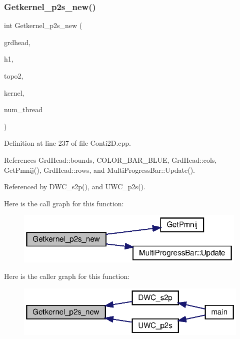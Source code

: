 \subsubsection{Getkernel\+\_\+p2s\+\_\+new()}
{\footnotesize\ttfamily int Getkernel\+\_\+p2s\+\_\+new (\begin{DoxyParamCaption}\item[{\textbf{ Grd\+Head}}]{grdhead,  }\item[{double}]{h1,  }\item[{double $\ast$}]{topo2,  }\item[{double $\ast$$\ast$}]{kernel,  }\item[{int}]{num\+\_\+thread }\end{DoxyParamCaption})}



Definition at line 237 of file Conti2\+D.\+cpp.



References Grd\+Head\+::bounds, C\+O\+L\+O\+R\+\_\+\+B\+A\+R\+\_\+\+B\+L\+UE, Grd\+Head\+::cols, Get\+Pmnij(), Grd\+Head\+::rows, and Multi\+Progress\+Bar\+::\+Update().



Referenced by D\+W\+C\+\_\+s2p(), and U\+W\+C\+\_\+p2s().

Here is the call graph for this function\+:\nopagebreak
\begin{figure}[H]
\begin{center}
\leavevmode
\includegraphics[width=315pt]{Conti2D_8h_a78d8a6b80166f8976a0f18caddbe1dcb_a78d8a6b80166f8976a0f18caddbe1dcb_cgraph}
\end{center}
\end{figure}
Here is the caller graph for this function\+:\nopagebreak
\begin{figure}[H]
\begin{center}
\leavevmode
\includegraphics[width=320pt]{Conti2D_8h_a78d8a6b80166f8976a0f18caddbe1dcb_a78d8a6b80166f8976a0f18caddbe1dcb_icgraph}
\end{center}
\end{figure}
\mbox{\label{Conti2D_8h_a9b8597bfdb8429464d4453d41cbfb2d3_a9b8597bfdb8429464d4453d41cbfb2d3}} 
